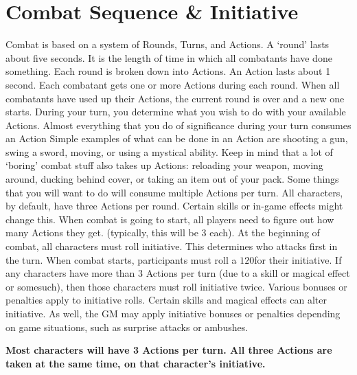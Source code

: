 \documentclass[twoside]{book}
\begin{document}
\section{Combat Sequence \& Initiative}
     Combat is based on a system of Rounds, Turns, and
             Actions. A `round' lasts about five seconds. It
             is the length of time in which all combatants have done
             something. Each round is broken down into Actions. An Action
             lasts about 1 second. Each combatant gets one or more
             Actions during each round. When all combatants have used up
             their Actions, the current round is over and a new one
             starts.  During your turn, you determine what you wish to do
             with your available Actions. Almost everything that you do
             of significance during your turn consumes an Action Simple
             examples of what can be done in an Action are shooting a
             gun, swing a sword, moving, or using a mystical ability.
             Keep in mind that a lot of `boring' combat stuff
             also takes up Actions: reloading your weapon, moving around,
             ducking behind cover, or taking an item out of your pack.
             Some things that you will want to do will consume multiple
             Actions per turn.  All characters, by default, have three Actions per
             round. Certain skills or in-game effects might change this.
             When combat is going to start, all players need to figure
             out how many Actions they get. (typically, this will be 3
             each).  At the beginning of combat, all characters must roll
             initiative. This determines who attacks first in the turn.
             When combat starts, participants must roll a \ensuremath{1}\ensuremath{20}\ensuremath{}for their
             initiative. If any characters have more than 3 Actions per
             turn (due to a skill or magical effect or somesuch), then
             those characters must roll initiative twice.  Various bonuses or penalties apply to initiative
             rolls. Certain skills and magical effects can alter
             initiative. As well, the GM may apply initiative bonuses or
             penalties depending on game situations, such as surprise
             attacks or ambushes. 

 \textbf{ Most characters will have 3 Actions per turn. All
             three Actions are taken at the same time, on that
             character's initiative. }
\end{document}
